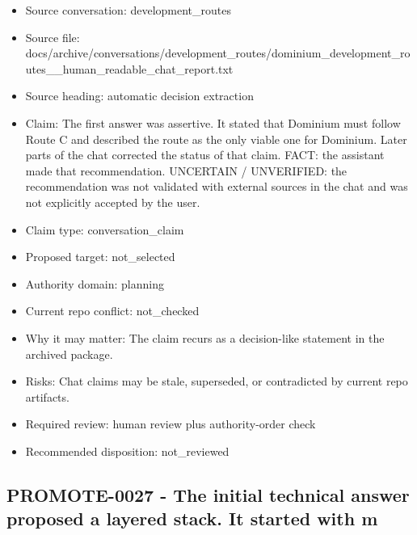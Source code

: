 \documentclass[11pt,a4paper]{report}
\begin{document}
\begin{itemize}
\item Source conversation: development\_routes
\item Source file: docs/archive/conversations/development\_routes/dominium\_development\_routes\_\_human\_readable\_chat\_report.txt
\item Source heading: automatic decision extraction
\item Claim: The first answer was assertive. It stated that Dominium must follow Route C and described the route as the only viable one for Dominium. Later parts of the chat corrected the status of that claim. FACT: the assistant made that recommendation. UNCERTAIN / UNVERIFIED: the recommendation was not validated with external sources in the chat and was not explicitly accepted by the user.
\item Claim type: conversation\_claim
\item Proposed target: not\_selected
\item Authority domain: planning
\item Current repo conflict: not\_checked
\item Why it may matter: The claim recurs as a decision-like statement in the archived package.
\item Risks: Chat claims may be stale, superseded, or contradicted by current repo artifacts.
\item Required review: human review plus authority-order check
\item Recommended disposition: not\_reviewed
\end{itemize}

\subsection{PROMOTE-0027 - The initial technical answer proposed a layered stack. It started with m}
\end{document}
